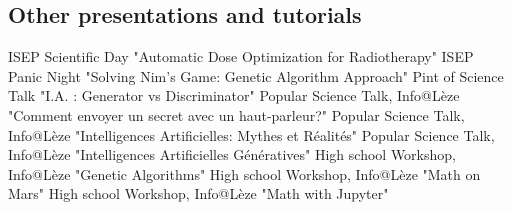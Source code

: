 \subsection*{Other presentations and tutorials}
ISEP Scientific Day "Automatic Dose Optimization for Radiotherapy"
ISEP Panic Night "Solving Nim's Game: Genetic Algorithm Approach"
Pint of Science Talk "I.A. : Generator vs Discriminator"
Popular Science Talk, Info@Lèze "Comment envoyer un secret avec un haut-parleur?"
Popular Science Talk, Info@Lèze "Intelligences Artificielles: Mythes et Réalités"
Popular Science Talk, Info@Lèze "Intelligences Artificielles Génératives"
High school Workshop, Info@Lèze "Genetic Algorithms"
High school Workshop, Info@Lèze "Math on Mars"
High school Workshop, Info@Lèze "Math with Jupyter"
